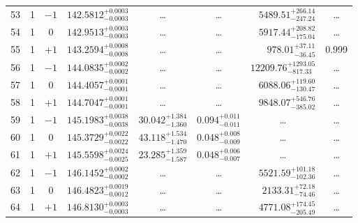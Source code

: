 \begin{table*}[!]
\begin{tabular}{llcrrlrc}
53 & 1 & $-1$ & $    142.5812_{-      0.0003}^{+      0.0003}$ & \multicolumn{1}{c}{\dots} & \multicolumn{1}{c}{\dots} & $     5489.51_{-      247.24}^{+      266.14}$ & \dots \\[1pt]
54 & 1 & 0 & $    142.9513_{-      0.0003}^{+      0.0003}$ & \multicolumn{1}{c}{\dots} & \multicolumn{1}{c}{\dots} & $     5917.44_{-      175.04}^{+      208.82}$ & \dots \\[1pt]
55 & 1 & $+1$ & $    143.2594_{-      0.0008}^{+      0.0008}$ & \multicolumn{1}{c}{\dots} & \multicolumn{1}{c}{\dots} & $      978.01_{-       36.45}^{+       37.11}$ & 0.999\\[1pt]
56 & 1 & $-1$ & $    144.0835_{-      0.0002}^{+      0.0002}$ & \multicolumn{1}{c}{\dots} & \multicolumn{1}{c}{\dots} & $    12209.76_{-      817.33}^{+     1293.05}$ & \dots \\[1pt]
57 & 1 & 0 & $    144.4057_{-      0.0001}^{+      0.0001}$ & \multicolumn{1}{c}{\dots} & \multicolumn{1}{c}{\dots} & $     6088.06_{-      130.47}^{+      119.60}$ & \dots \\[1pt]
58 & 1 & $+1$ & $    144.7047_{-      0.0001}^{+      0.0001}$ & \multicolumn{1}{c}{\dots} & \multicolumn{1}{c}{\dots} & $     9848.07_{-      385.02}^{+      546.76}$ & \dots \\[1pt]
59 & 1 & $-1$ & $    145.1983_{-      0.0038}^{+      0.0038}$ & $      30.042_{-       1.360}^{+       1.384}$ & $       0.094_{-       0.011}^{+       0.011}$ & \multicolumn{1}{c}{\dots} & \dots \\[1pt]
60 & 1 & 0 & $    145.3729_{-      0.0022}^{+      0.0022}$ & $      43.118_{-       1.470}^{+       1.534}$ & $       0.048_{-       0.009}^{+       0.008}$ & \multicolumn{1}{c}{\dots} & \dots \\[1pt]
61 & 1 & $+1$ & $    145.5598_{-      0.0025}^{+      0.0024}$ & $      23.285_{-       1.587}^{+       1.359}$ & $       0.048_{-       0.007}^{+       0.006}$ & \multicolumn{1}{c}{\dots} & \dots \\[1pt]
62 & 1 & $-1$ & $    146.1452_{-      0.0002}^{+      0.0002}$ & \multicolumn{1}{c}{\dots} & \multicolumn{1}{c}{\dots} & $     5521.59_{-      102.36}^{+      101.18}$ & \dots \\[1pt]
63 & 1 & 0 & $    146.4823_{-      0.0012}^{+      0.0019}$ & \multicolumn{1}{c}{\dots} & \multicolumn{1}{c}{\dots} & $     2133.31_{-       74.46}^{+       72.18}$ & \dots \\[1pt]
64 & 1 & $+1$ & $    146.8130_{-      0.0003}^{+      0.0003}$ & \multicolumn{1}{c}{\dots} & \multicolumn{1}{c}{\dots} & $     4771.08_{-      205.49}^{+      174.45}$ & \dots \\[1pt]

\end{tabular}
\end{table*}
